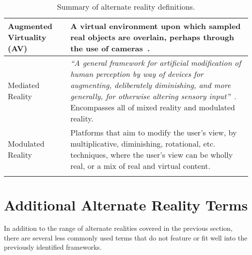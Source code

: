 \begin{center}
\begin{longtable}{ l p{10cm} }
\midrule


Augmented Virtuality (AV) & A virtual environment upon which sampled real objects are overlain, perhaps through the use of cameras~\cite{caballero:behand}. \\


\midrule


Mediated Reality & \textit{``A general framework for artificial modification of human perception by way of devices for augmenting, deliberately diminishing, and more generally, for otherwise altering sensory input''}~\cite{Mann2002a}. Encompasses all of mixed reality and modulated reality. \\

\midrule


Modulated Reality & Platforms that aim to modify the user's view, by multiplicative, diminishing, rotational, etc. techniques, where the user's view can be wholly real, or a mix of real and virtual content. \\

\bottomrule
\caption{Summary of alternate reality definitions.}
\end{longtable}
\end{center}


\section{Additional Alternate Reality Terms}

In addition to the range of alternate realities covered in the previous section, there are several less commonly used terms that do not feature or fit well into the previously identified frameworks.

